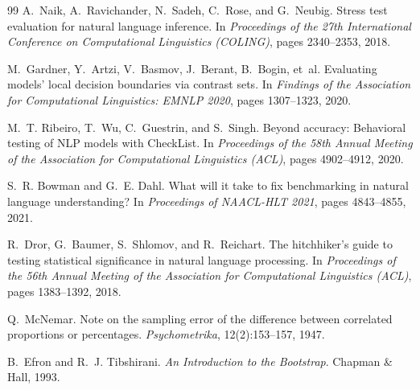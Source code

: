 {\begin{thebibliography}{99}
A.~Naik, A.~Ravichander, N.~Sadeh, C.~Rose, and G.~Neubig.
\newblock Stress test evaluation for natural language inference.
\newblock In \emph{Proceedings of the 27th International Conference on Computational Linguistics (COLING)}, pages 2340--2353, 2018.

M.~Gardner, Y.~Artzi, V.~Basmov, J.~Berant, B.~Bogin, et~al.
\newblock Evaluating models' local decision boundaries via contrast sets.
\newblock In \emph{Findings of the Association for Computational Linguistics: EMNLP 2020}, pages 1307--1323, 2020.

M.~T. Ribeiro, T.~Wu, C.~Guestrin, and S.~Singh.
\newblock Beyond accuracy: Behavioral testing of NLP models with CheckList.
\newblock In \emph{Proceedings of the 58th Annual Meeting of the Association for Computational Linguistics (ACL)}, pages 4902--4912, 2020.

S.~R. Bowman and G.~E. Dahl.
\newblock What will it take to fix benchmarking in natural language understanding?
\newblock In \emph{Proceedings of NAACL-HLT 2021}, pages 4843--4855, 2021.

R.~Dror, G.~Baumer, S.~Shlomov, and R.~Reichart.
\newblock The hitchhiker's guide to testing statistical significance in natural language processing.
\newblock In \emph{Proceedings of the 56th Annual Meeting of the Association for Computational Linguistics (ACL)}, pages 1383--1392, 2018.

Q.~McNemar.
\newblock Note on the sampling error of the difference between correlated proportions or percentages.
\newblock \emph{Psychometrika}, 12(2):153--157, 1947.

B.~Efron and R.~J. Tibshirani.
\newblock \emph{An Introduction to the Bootstrap}.
\newblock Chapman \& Hall, 1993.

\end{thebibliography}
}

